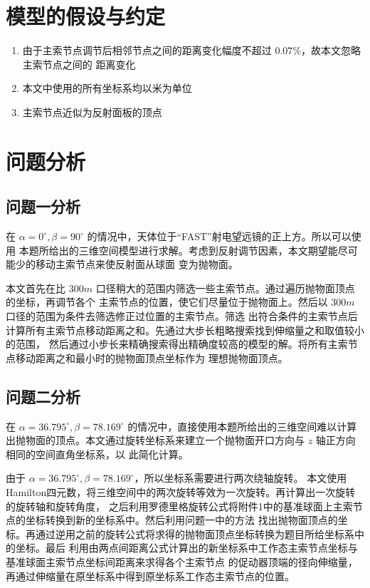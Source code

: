\documentclass[withoutpreface,bwprint]{cumcmthesis} %
\begin{document}
\section{模型的假设与约定}
\begin{enumerate}
    \item 由于主索节点调节后相邻节点之间的距离变化幅度不超过 $0.07\%$，故本文忽略主索节点之间的
            距离变化
    \item 本文中使用的所有坐标系均以米为单位
    \item 主索节点近似为反射面板的顶点
\end{enumerate}
\section{问题分析}
\subsection{问题一分析}
在 $\alpha = 0^\circ , \beta = 90^\circ$ 的情况中，天体位于“FAST”射电望远镜的正上方。所以可以使用
本题所给出的三维空间模型进行求解。考虑到反射调节因素，本文期望能尽可能少的移动主索节点来使反射面从球面
变为抛物面。

本文首先在比 $300m$ 口径稍大的范围内筛选一些主索节点。通过遍历抛物面顶点的坐标，再调节各个
主索节点的位置，使它们尽量位于抛物面上。然后以 $300m$ 口径的范围为条件去筛选修正过位置的主索节点。筛选
出符合条件的主索节点后计算所有主索节点移动距离之和。先通过大步长粗略搜索找到伸缩量之和取值较小的范围，
然后通过小步长来精确搜索得出精确度较高的模型的解。将所有主索节点移动距离之和最小时的抛物面顶点坐标作为
理想抛物面顶点。
\subsection{问题二分析}
在 $\alpha = 36.795^\circ , \beta = 78.169^\circ$ 的情况中，直接使用本题所给出的三维空间难以计算
出抛物面的顶点。本文通过旋转坐标系来建立一个抛物面开口方向与 $z$ 轴正方向相同的空间直角坐标系，以
此简化计算。

由于 $\alpha = 36.795^\circ , \beta = 78.169^\circ$，所以坐标系需要进行两次绕轴旋转。
本文使用Hamilton四元数，将三维空间中的两次旋转等效为一次旋转。再计算出一次旋转的旋转轴和旋转角度，
之后利用罗德里格旋转公式将附件1中的基准球面上主索节点的坐标转换到新的坐标系中。然后利用问题一中的方法
找出抛物面顶点的坐标。再通过逆用之前的旋转公式将求得的抛物面顶点坐标转换为题目所给坐标系中的坐标。最后
利用由两点间距离公式计算出的新坐标系中工作态主索节点坐标与基准球面主索节点坐标间距离来求得各个主索节点
的促动器顶端的径向伸缩量，再通过伸缩量在原坐标系中得到原坐标系工作态主索节点的位置。
\end{document}
